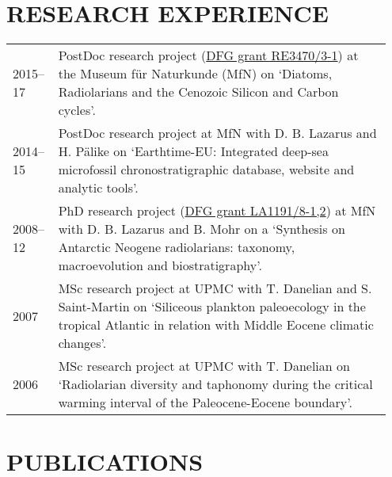 \documentclass[11pt, a4paper]{article}
\begin{document}
\section{RESEARCH EXPERIENCE}
\begin{longtable}{p{0.1\linewidth} P{0.85\linewidth}}
2015--17 & PostDoc research project (\href{http://gepris.dfg.de/gepris/projekt/279867559}{DFG grant RE3470/3-1}) at the Museum f\"{u}r Naturkunde (MfN) on `Diatoms, Radiolarians and the Cenozoic Silicon and Carbon cycles'.\\
2014--15 & PostDoc research project at MfN with D. B. Lazarus and H. P\"{a}like on `Earthtime-EU: Integrated deep-sea microfossil chronostratigraphic database, website and analytic tools'.\\
2008--12 & PhD research project (\href{http://gepris.dfg.de/gepris/projekt/84744046}{DFG grant LA1191/8-1,2}) at MfN with D. B. Lazarus and B. Mohr on a `Synthesis on Antarctic Neogene radiolarians: taxonomy, macroevolution and biostratigraphy'.\\
2007 & MSc research project at UPMC with T. Danelian and S. Saint-Martin on `Siliceous plankton paleoecology in the tropical Atlantic in relation with Middle Eocene climatic changes'.\\
2006 & MSc research project at UPMC with T. Danelian on `Radiolarian diversity and taphonomy during the critical warming interval of the Paleocene-Eocene boundary'.\\
\end{longtable}

\section{PUBLICATIONS}
\end{document}
